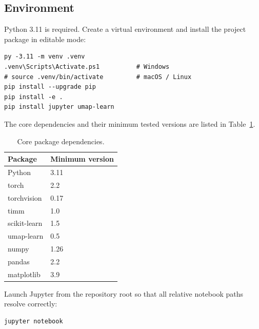\documentclass[11pt]{article}
\begin{document}
\subsection{Environment}

Python 3.11 is required. Create a virtual environment and install the project package in editable mode:

\begin{verbatim}
py -3.11 -m venv .venv
.venv\Scripts\Activate.ps1          # Windows
# source .venv/bin/activate         # macOS / Linux
pip install --upgrade pip
pip install -e .
pip install jupyter umap-learn
\end{verbatim}

The core dependencies and their minimum tested versions are listed in Table~\ref{tab:dependencies}.

\begin{table}[H]
\centering
\caption{Core package dependencies.}
\label{tab:dependencies}
\begin{tabular}{ll}
\toprule
Package & Minimum version \\
\midrule
Python       & 3.11 \\
torch        & 2.2 \\
torchvision  & 0.17 \\
timm         & 1.0 \\
scikit-learn & 1.5 \\
umap-learn   & 0.5 \\
numpy        & 1.26 \\
pandas       & 2.2 \\
matplotlib   & 3.9 \\
\bottomrule
\end{tabular}
\end{table}

Launch Jupyter from the repository root so that all relative notebook paths resolve correctly:

\begin{verbatim}
jupyter notebook
\end{verbatim}
\end{document}
